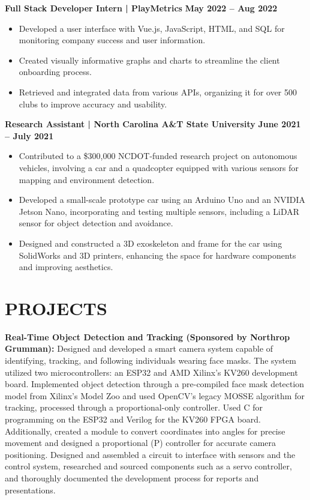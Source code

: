 \documentclass[letterpaper,9pt]{article}
\begin{document}
\noindent \textbf{Full Stack Developer Intern | PlayMetrics}  \hfill \textbf{May 2022 – Aug 2022}
\begin{itemize}[leftmargin=*,itemsep=0pt,topsep=0pt]
\item Developed a user interface with Vue.js, JavaScript, HTML, and SQL for monitoring company success and user information.
\item Created visually informative graphs and charts to streamline the client onboarding process.
\item Retrieved and integrated data from various APIs, organizing it for over 500 clubs to improve accuracy and usability.
\end{itemize}

\noindent \textbf{Research Assistant | North Carolina A\&T State University}  \hfill \textbf{June 2021 – July 2021}
\begin{itemize}[leftmargin=*,itemsep=0pt,topsep=0pt]
\item Contributed to a \$300,000 NCDOT-funded research project on autonomous vehicles, involving a car and a quadcopter equipped with various sensors for mapping and environment detection.
\item Developed a small-scale prototype car using an Arduino Uno and an NVIDIA Jetson Nano, incorporating and testing multiple sensors, including a LiDAR sensor for object detection and avoidance.
\item Designed and constructed a 3D exoskeleton and frame for the car using SolidWorks and 3D printers, enhancing the space for hardware components and improving aesthetics.
\end{itemize}

\section*{PROJECTS}
\noindent \textbf{Real-Time Object Detection and Tracking (Sponsored by Northrop Grumman):} Designed and developed a smart camera system capable of identifying, tracking, and following individuals wearing face masks. The system utilized two microcontrollers: an ESP32 and AMD Xilinx’s KV260 development board. Implemented object detection through a pre-compiled face mask detection model from Xilinx’s Model Zoo and used OpenCV’s legacy MOSSE algorithm for tracking, processed through a proportional-only controller. Used C for programming on the ESP32 and Verilog for the KV260 FPGA board. Additionally, created a module to convert coordinates into angles for precise movement and designed a proportional (P) controller for accurate camera positioning. Designed and assembled a circuit to interface with sensors and the control system, researched and sourced components such as a servo controller, and thoroughly documented the development process for reports and presentations.\\
\end{document}

